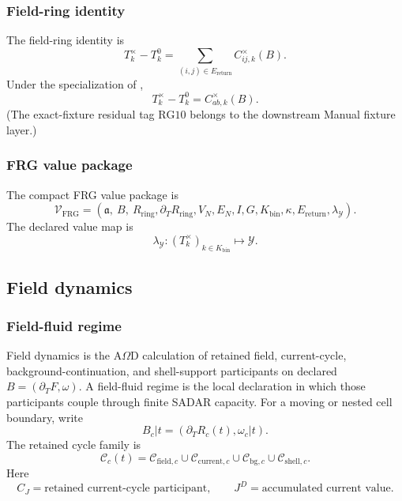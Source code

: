 \subsubsection{Field-ring identity}\label{subsec:frg-identity}
The field-ring identity is
\begin{equation*}
T_k^\times-T_k^0
=
\sum_{(i,j)\in E_{\mathrm{return}}}
C_{ij,k}^{\times}(B).
\tag{RG8}\label{eq:frg-identity}
\end{equation*}
Under the specialization of ,
\begin{equation*}
T_k^\times-T_k^0=C_{ab,k}^{\times}(B).
\tag{RG9}\label{eq:frg-identity-two-gate}
\end{equation*}
(The exact-fixture residual tag \(\mathrm{RG10}\) belongs to the downstream Manual fixture layer.)


\subsubsection{FRG value package}\label{subsec:frg-value-package}
The compact FRG value package is
\begin{equation*}
\mathcal V_{\mathrm{FRG}}
=
(\mathfrak a,\ B,\ R_{\mathrm{ring}},\partial_T R_{\mathrm{ring}},
V_N,E_N,I,G,K_{\mathrm{bin}},\kappa,E_{\mathrm{return}},\lambda_{\mathcal Y}).
\tag{RG11}\label{eq:frg-value-package}
\end{equation*}
The declared value map is
\begin{equation*}
\lambda_{\mathcal Y}:
(T_k^\times)_{k\in K_{\mathrm{bin}}}
\mapsto
\mathcal Y.
\tag{RG12}\label{eq:frg-value-map}
\end{equation*}


\subsection{Field dynamics}\label{sec:field-dynamics}

\subsubsection{Field-fluid regime}\label{subsec:field-fluid-regime}
Field dynamics is the A\(\Omega\)D calculation of retained field, current-cycle, background-continuation, and shell-support participants on declared \(B=(\partial_TF,\omega)\). A field-fluid regime is the local declaration in which those participants couple through finite SADAR capacity. For a moving or nested cell boundary, write
\[
B_c|t=(\partial_T R_c(t),\omega_c|t).
\]
The retained cycle family is
\[
\mathcal C_c(t)
=
\mathcal C_{\mathrm{field},c}
\cup
\mathcal C_{\mathrm{current},c}
\cup
\mathcal C_{\mathrm{bg},c}
\cup
\mathcal C_{\mathrm{shell},c}.
\]
Here
\[
C_J=\text{retained current-cycle participant},
\qquad
J^D=\text{accumulated current value}.
\]

